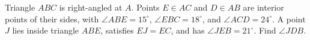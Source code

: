 Triangle $ABC$ is right-angled at $A$. Points $E\in AC$ and $D\in AB$ are interior points of their sides, with $\angle ABE=15^\circ$, $\angle EBC=18^\circ$, and $\angle ACD=24^\circ$. A point $J$ lies inside triangle $ABE$, satisfies $EJ=EC$, and has $\angle JEB=21^\circ$. Find $\angle JDB$.
